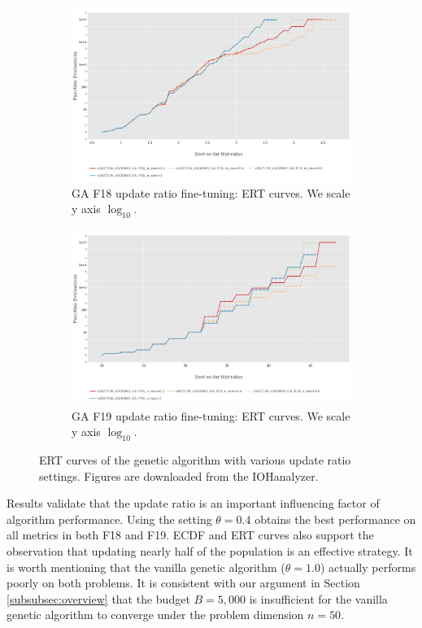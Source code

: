 \documentclass{article}
\begin{document}
\begin{figure}[!ht]
    \begin{subfigure}[h]{0.95\linewidth}
        \includegraphics[width=\linewidth]{ga/f18/urate_ert.png}
        \caption{GA F18 update ratio fine-tuning: ERT curves. We scale y axis $\log_{10}$.}
    \end{subfigure}
    \hfill
    \begin{subfigure}[h]{0.95\linewidth}
        \includegraphics[width=\linewidth]{ga/f19/urate_ert.png}
        \caption{GA F19 update ratio fine-tuning: ERT curves. We scale y axis $\log_{10}$.}
    \end{subfigure}
    \caption{ERT curves of the genetic algorithm with various update ratio settings. Figures are downloaded from the IOHanalyzer.}
    \label{fig:experi-ga-urate-ert}
\end{figure}

Results validate that the update ratio is an important influencing factor of algorithm performance. Using the setting $\theta = 0.4$ obtains the best performance on all metrics in both F18 and F19. ECDF and ERT curves also support the observation that updating nearly half of the population is an effective strategy. It is worth mentioning that the vanilla genetic algorithm ($\theta = 1.0$) actually performs poorly on both problems. It is consistent with our argument in Section \ref{subsubsec:overview} that the budget $B = 5,000$ is insufficient for the vanilla genetic algorithm to converge under the problem dimension $n = 50$.
\end{document}
